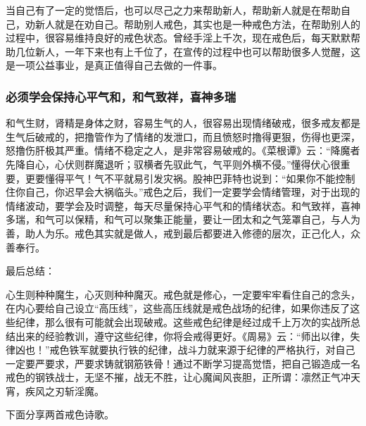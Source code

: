 当自己有了一定的觉悟后，也可以尽己之力来帮助新人，帮助新人就是在帮助自己，劝新人就是在劝自己。帮助别人戒色，其实也是一种戒色方法，在帮助别人的过程中，很容易维持良好的戒色状态。曾经手淫上千次，现在戒色后，每天默默帮助几位新人，一年下来也有上千位了，在宣传的过程中也可以帮助很多人觉醒，这是一项公益事业，是真正值得自己去做的一件事。

\subsubsection{必须学会保持心平气和，和气致祥，喜神多瑞}

和气生财，肾精是身体之财，容易生气的人，很容易出现情绪破戒，很多戒友都是生气后破戒的，把撸管作为了情绪的发泄口，而且愤怒时撸得更狠，伤得也更深，怒撸伤肝极其严重。情绪不稳定之人，是非常容易破戒的。《菜根谭》云：“降魔者先降自心，心伏则群魔退听；驭横者先驭此气，气平则外横不侵。”懂得伏心很重要，更要懂得平气！气不平就易引发灾祸。股神巴菲特也说到：“如果你不能控制住你自己，你迟早会大祸临头。”戒色之后，我们一定要学会情绪管理，对于出现的情绪波动，要学会及时调整，每天尽量保持心平气和的情绪状态。和气致祥，喜神多瑞，和气可以保精，和气可以聚集正能量，要让一团太和之气笼罩自己，与人为善，助人为乐。戒色其实就是做人，戒到最后都要进入修德的层次，正己化人，众善奉行。

最后总结：

心生则种种魔生，心灭则种种魔灭。戒色就是修心，一定要牢牢看住自己的念头，在内心要给自己设立“高压线”，这些高压线就是戒色战场的纪律，如果你违反了这些纪律，那么很有可能就会出现破戒。这些戒色纪律是经过成千上万次的实战所总结出来的经验教训，遵守这些纪律，你将会戒得更好。《周易》云：“师出以律，失律凶也！”戒色铁军就要执行铁的纪律，战斗力就来源于纪律的严格执行，对自己一定要严要求，严要求铸就钢筋铁骨！通过不断学习提高觉悟，把自己锻造成一名戒色的钢铁战士，无坚不摧，战无不胜，让心魔闻风丧胆，正所谓：凛然正气冲天宵，疾风之刃斩淫魔。

下面分享两首戒色诗歌。


